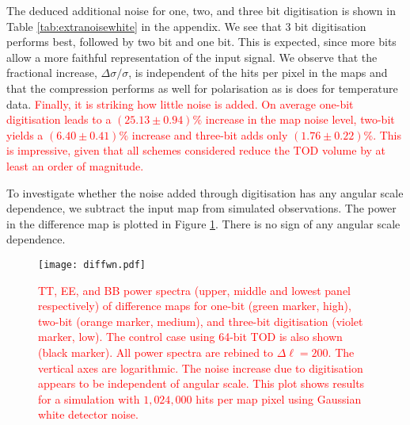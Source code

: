 \documentclass[apj]{emulateapj}
\newcommand{\changed}[1]{\textcolor{Red}{#1}}
\begin{document}


The deduced additional noise for one, two, and three bit digitisation is shown in Table \ref{tab:extranoisewhite} in the appendix. 
We see that 3 bit digitisation performs best, followed by two bit and one bit. 
This is expected, since more bits allow a more faithful representation of the input signal. 
We observe that the fractional increase, $\Delta \sigma / \sigma$, is independent of the hits per pixel in the maps and that the compression performs as well for polarisation as is does for temperature data. \changed{Finally, it is striking how little noise is added. 
On average one-bit digitisation leads to a $(25.13\pm 0.94)\%$ increase in the map noise level, two-bit yields a $(6.40\pm0.41)\%$ increase and three-bit adds only $(1.76\pm0.22)\%$. 
This is impressive, given that all schemes considered reduce the TOD volume by at least an order of magnitude.}

To investigate whether the noise added through digitisation has any angular scale dependence, we subtract the input map from simulated observations. The power in the difference map is plotted in Figure \ref{fig:diffpswn}. There is no sign of any angular scale dependence.


\begin{figure}[htb]\centering
\texttt{[image: diffwn.pdf]}
  \caption[Current ]{
  \changed{TT, EE, and BB power spectra (upper, middle and lowest panel respectively) of difference maps for one-bit (green marker, high), two-bit (orange marker, medium), and three-bit digitisation (violet marker, low). The control case using 64-bit TOD is also shown (black marker). All power spectra are rebined to $\Delta \ell = 200$. The vertical axes are logarithmic. The noise increase due to digitisation appears to be independent of angular scale. This plot shows results for a simulation with $1,024,000$ hits per map pixel using Gaussian white detector noise.}
\label{fig:diffpswn}
}
\end{figure}
\end{document}

